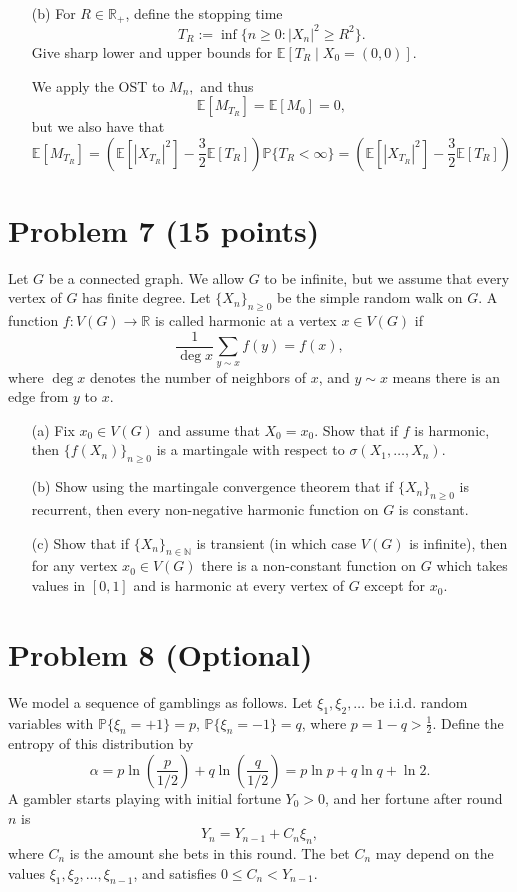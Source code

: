 \documentclass[11pt]{article}
\newcommand{\bbE}{\mathbb{E}}
\newcommand{\bbP}{\mathbb{P}}
\begin{document}
\begin{itemize}
    
    \item[(b)] For \(R \in \mathbb{R}_+\), define the stopping time
    \[
    T_R := \inf\{n \geq 0 : |X_n|^2 \geq R^2\}.
    \]
    Give sharp lower and upper bounds for \(\mathbb{E}[T_R \mid X_0 = (0, 0)]\).
\begin{solution}
    We apply the OST to $M_n,$ and thus 
    \[\bbE[M_{T_R}] = \bbE[M_0] = 0,\] but we also have that 
    \[\bbE[M_{T_R}] = (\bbE[|X_{T_R}|^2]-\frac{3}{2}\bbE[T_R])\bbP\{T_R < \infty\} = (\bbE[|X_{T_R}|^2]-\frac{3}{2}\bbE[T_R])\]
\end{solution}
\end{itemize}

\newpage

\section*{Problem 7 (15 points)}
Let \(G\) be a connected graph. We allow \(G\) to be infinite, but we assume that every vertex of \(G\) has finite degree. Let \(\{X_n\}_{n \geq 0}\) be the simple random walk on \(G\). A function \(f : V(G) \to \mathbb{R}\) is called harmonic at a vertex \(x \in V(G)\) if
\[
\frac{1}{\deg x} \sum_{y \sim x} f(y) = f(x),
\]
where \(\deg x\) denotes the number of neighbors of \(x\), and \(y \sim x\) means there is an edge from \(y\) to \(x\).

\begin{itemize}
    \item[(a)] Fix \(x_0 \in V(G)\) and assume that \(X_0 = x_0\). Show that if \(f\) is harmonic, then \(\{f(X_n)\}_{n \geq 0}\) is a martingale with respect to \(\sigma(X_1, \ldots, X_n)\).
    \item[(b)] Show using the martingale convergence theorem that if \(\{X_n\}_{n \geq 0}\) is recurrent, then every non-negative harmonic function on \(G\) is constant.
    \item[(c)] Show that if \(\{X_n\}_{n \in \mathbb{N}}\) is transient (in which case \(V(G)\) is infinite), then for any vertex \(x_0 \in V(G)\) there is a non-constant function on \(G\) which takes values in \([0, 1]\) and is harmonic at every vertex of \(G\) except for \(x_0\).
\end{itemize}

\newpage

\section*{Problem 8 (Optional)}
We model a sequence of gamblings as follows. Let \(\xi_1, \xi_2, \ldots\) be i.i.d. random variables with \(\mathbb{P}\{\xi_n = +1\} = p\), \(\mathbb{P}\{\xi_n = -1\} = q\), where \(p = 1 - q > \frac{1}{2}\). Define the entropy of this distribution by
\[
\alpha = p \ln\left(\frac{p}{1/2}\right) + q \ln\left(\frac{q}{1/2}\right) = p \ln p + q \ln q + \ln 2.
\]
A gambler starts playing with initial fortune \(Y_0 > 0\), and her fortune after round \(n\) is
\[
Y_n = Y_{n-1} + C_n \xi_n,
\]
where \(C_n\) is the amount she bets in this round. The bet \(C_n\) may depend on the values \(\xi_1, \xi_2, \ldots, \xi_{n-1}\), and satisfies \(0 \leq C_n < Y_{n-1}\).
\end{document}
